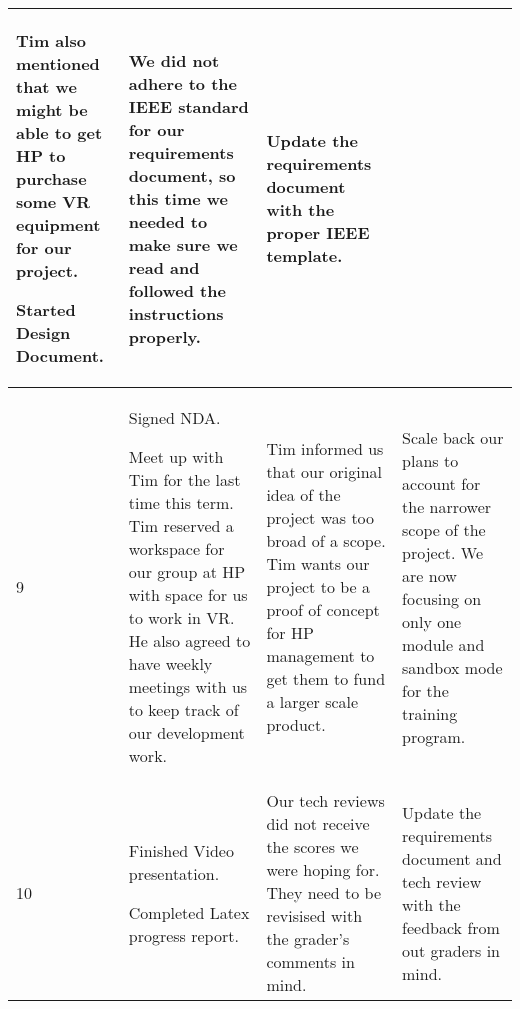 \documentclass[onecolumn, draftclsnofoot,10pt, compsoc]{IEEEtran}
\begin{document}
\begin{longtable}{ |p{2cm}||p{5cm}|p{5cm}|p{5cm}|  }
    Tim also mentioned that we might be able to get HP to purchase some VR equipment for our project.
 
    Started Design Document.
    & We did not adhere to the IEEE standard for our requirements document, so this time we needed to make sure we read and followed the instructions properly.
    & Update the requirements document with the proper IEEE template.\\
\hline
 9 & Signed NDA.
     
     Meet up with Tim for the last time this term. Tim reserved a workspace for our group at HP with space for us to work in VR. He also agreed to have weekly meetings with us to keep track of our development work.
     & Tim informed us that our original idea of the project was too broad of a scope. Tim wants our project to be a proof of concept for HP management to get them to fund a larger scale product.
     & Scale back our plans to account for the narrower scope of the project. We are now focusing on only one module and sandbox mode for the training program.\\
\hline
 10 & Finished Video presentation.
 
      Completed Latex progress report. 
      & Our tech reviews did not receive the scores we were hoping for. They need to be revisised with the grader's comments in mind.
      &  Update the requirements document and tech review with the feedback from out graders in mind. \\
 \hline
\end{longtable}
\end{document}
